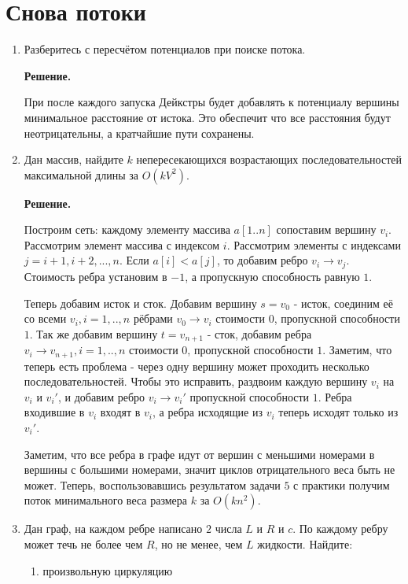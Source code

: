 \section{Снова потоки}
\begin{enumerate}
	\item Разберитесь с пересчётом потенциалов при поиске потока.
	
	\textbf{Решение.}
	
	При после каждого запуска Дейкстры будет добавлять к потенциалу вершины минимальное расстояние от истока. Это 
	обеспечит что все расстояния будут неотрицательны, а кратчайшие пути сохранены.
	
	\item Дан массив, найдите $k$ непересекающихся возрастающих последовательностей максимальной длины за $O(kV^2)$.
	
	\textbf{Решение.}
	
	Построим сеть: каждому элементу массива $a[1..n]$ сопоставим вершину $v_i$. Рассмотрим элемент массива с 
	индексом $i$. Рассмотрим элементы с индексами $j = i + 1, i + 2, ..., n$. Если $a[i] < a[j]$, то добавим ребро 
	$v_i \to v_j$. Стоимость ребра установим в $-1$, а пропускную способность равную $1$. 
	
	Теперь добавим исток и сток. Добавим вершину $s = v_0$ - исток, соединим её со всеми $v_i, i = 1,..,n$ рёбрами 
	$v_0 \to v_i$ стоимости 0, пропускной способности $1$. Так же добавим вершину $t = v_{n + 1}$ - сток, добавим 
	ребра $v_i \to v_{n + 1}, i = 1,..,n$ стоимости $0$, пропускной способности $1$. Заметим, что теперь есть 
	проблема - через одну вершину может проходить несколько последовательностей. Чтобы это исправить, раздвоим 
	каждую вершину $v_i$ на $v_i$ и $v_i'$, и добавим ребро $v_i \to v_i'$ пропускной способности $1$. Ребра 
	входившие в $v_i$ входят в $v_i$, а ребра исходящие из $v_i$ теперь исходят только из $v_i'$.  
	
	Заметим, что все ребра в графе идут от вершин с меньшими номерами в вершины с большими номерами, значит циклов 
	отрицательного веса быть не может. Теперь, воспользовавшись результатом задачи $5$ с практики получим поток 
	минимального веса размера $k$ за $O(kn^2)$.

	
	\item Дан граф, на каждом ребре написано $2$ числа $L$ и $R$ и $c$. По каждому ребру может течь не более
	чем $R$, но не менее, чем $L$ жидкости. Найдите:
	\begin{enumerate}
		\item произвольную циркуляцию
		

\end{enumerate}
\end{enumerate}
